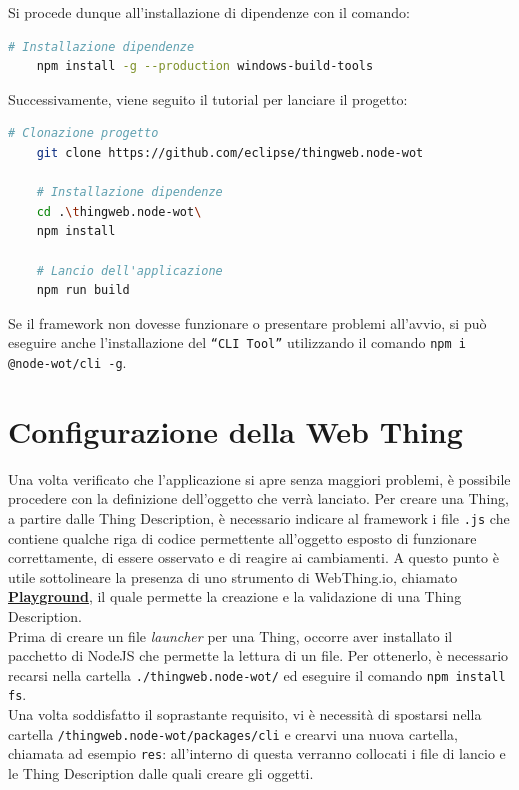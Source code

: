 \documentclass[12pt,a4paper,openright,oneside]{report}
\newcommand{\quotes}[1]{``#1''}
\begin{document}
Si procede dunque all'installazione di dipendenze con il comando:
\begin{lstlisting}[language=bash]
	# Installazione dipendenze
	npm install -g --production windows-build-tools
\end{lstlisting}

Successivamente, viene seguito il tutorial per lanciare il progetto:
\begin{lstlisting}[language=bash]
	# Clonazione progetto
	git clone https://github.com/eclipse/thingweb.node-wot
	
	# Installazione dipendenze
	cd .\thingweb.node-wot\
	npm install
	
	# Lancio dell'applicazione
	npm run build
\end{lstlisting}

Se il framework non dovesse funzionare o presentare problemi all'avvio, si può eseguire anche l'installazione del \texttt{\quotes{CLI Tool}} utilizzando il comando \texttt{npm i @node-wot/cli -g}. 


\section{Configurazione della Web Thing}
\label{sec:configuring:wt}
Una volta verificato che l'applicazione si apre senza maggiori problemi, è possibile procedere con la definizione dell'oggetto che verrà lanciato. Per creare una Thing, a partire dalle Thing Description, è necessario indicare al framework i file \texttt{.js} che contiene qualche riga di codice permettente all'oggetto esposto di funzionare correttamente, di essere osservato e di reagire ai cambiamenti. A questo punto è utile sottolineare la presenza di uno strumento di WebThing.io, chiamato \href{http://plugfest.thingweb.io/playground/}{\textbf{Playground}}, il quale permette la creazione e la validazione di una Thing Description.\\

Prima di creare un file \textit{launcher} per una Thing, occorre aver installato il pacchetto di NodeJS che permette la lettura di un file. Per ottenerlo, è necessario recarsi nella cartella \texttt{./thingweb.node-wot/} ed eseguire il comando \texttt{npm install fs}.\\

Una volta soddisfatto il soprastante requisito, vi è necessità di spostarsi nella cartella \texttt{/thingweb.node-wot/packages/cli} e crearvi una nuova cartella, chiamata ad esempio \texttt{res}: all'interno di questa verranno collocati i file di lancio e le Thing Description dalle quali creare gli oggetti.\\
\end{document}
